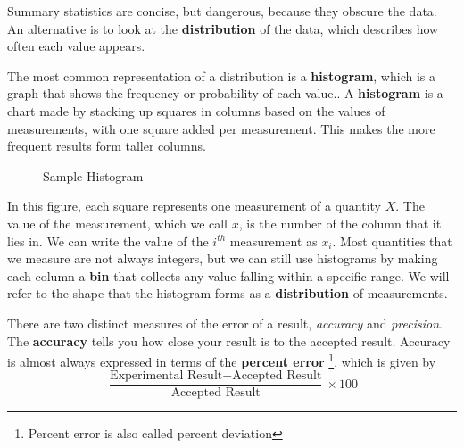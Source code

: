 Summary statistics are concise, but dangerous, because they obscure
the data.  An alternative is to look at the \textbf{distribution} of the
data, which describes how often each value appears.

The most common representation of a distribution is a \textbf{histogram},
which is a graph that shows the frequency or probability
of each value.. A \textbf{histogram} is a chart made by stacking up squares in columns based on the values of measurements, with one square added per measurement. This makes the more frequent results form taller columns.

\begin{figure}[h]
\begin{center}
\caption{Sample Histogram}
\end{center}
\end{figure}

In this figure, each square represents one measurement of a quantity $X$. The value of the measurement, which we call $x$, is the number of the column that it lies in. We can write the value of the $i^{th}$ measurement as $x_i$. Most quantities that we measure are not always integers, but we can still use histograms by making each column a \textbf{bin} that collects any value falling within a specific range. We will refer to the shape that the histogram forms as a \textbf{distribution} of measurements. 

There are two distinct measures of the error of a result, \textit{accuracy} and \textit{precision}. The \textbf{accuracy} tells you how close your result is to the accepted result. Accuracy is almost always expressed in terms of the \textbf{percent error}
\footnote{Percent error is also called percent deviation}, which is given by 
\begin{equation}\frac{\textrm{Experimental Result} - \textrm{Accepted Result}}{\textrm{Accepted Result}} \times 100 \end{equation}


